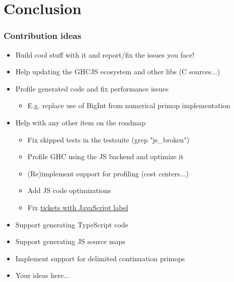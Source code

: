 \documentclass[aspectratio=169]{beamer}
\begin{document}
\section{Conclusion}

\begin{frame}
\frametitle{Contribution ideas}
  \begin{itemize}
   \item Build cool stuff with it and report/fix the issues you face!
   \item Help updating the GHCJS ecosystem and other libs (C sources...)
   \item Profile generated code and fix performance issues
    \begin{itemize}
   \item E.g. replace use of BigInt from numerical primop implementation
    \end{itemize}
   \item Help with any other item on the roadmap
     \begin{itemize}
   \item Fix skipped tests in the testsuite (grep "js\_broken")
   \item Profile GHC using the JS backend and optimize it
   \item (Re)implement support for profiling (cost centers...)
   \item Add JS code optimizations
   \item Fix \href{https://gitlab.haskell.org/ghc/ghc/-/issues?label\_name=javascript}{tickets with JavaScript label}
     \end{itemize}
   \item Support generating TypeScript code
   \item Support generating JS source maps
   \item Implement support for delimited continuation primops
   \item Your ideas here...
   \end{itemize}
\end{frame}
\end{document}
